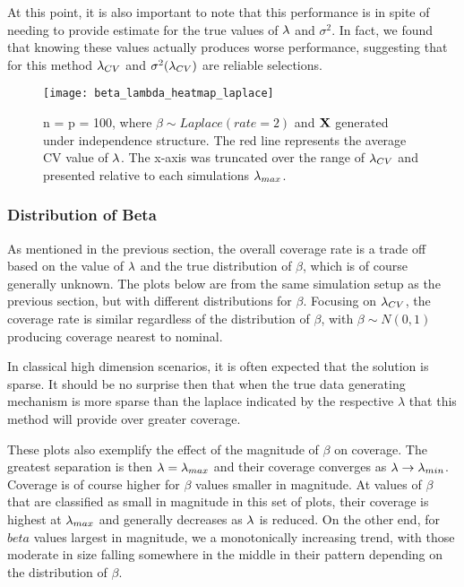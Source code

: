 At this point, it is also important to note that this performance is in spite of needing to provide estimate for the true values of $\lambda$ and $\sigma^2$. In fact, we found that knowing these values actually produces worse performance, suggesting that for this method $\lambda_{CV}$ and $\sigma^2(\lambda_{CV})$ are reliable selections.

\begin{figure}
  \texttt{[image: beta\_lambda\_heatmap\_laplace]}
  \caption{\label{Fig:beta_lambda_heatmap_laplace} n = p = 100, where $\beta \sim Laplace(rate = 2)$ and $\mathbf{X}$ generated under independence structure. The red line represents the average CV value of $\lambda$. The x-axis was truncated over the range of $\lambda_{CV}$ and presented relative to each simulations $\lambda_{max}$.}
\end{figure}

\subsubsection{Distribution of Beta}

As mentioned in the previous section, the overall coverage rate is a trade off based on the value of $\lambda$ and the true distribution of $\beta$, which is of course generally unknown. The plots below are from the same simulation setup as the previous section, but with different distributions for $\beta$. Focusing on $\lambda_{CV}$, the coverage rate is similar regardless of the distribution of $\beta$, with $\beta \sim N(0, 1)$ producing coverage nearest to nominal.

In classical high dimension scenarios, it is often expected that the solution is sparse. It should be no surprise then that when the true data generating mechanism is more sparse than the laplace indicated by the respective $\lambda$ that this method will provide over greater coverage.

These plots also exemplify the effect of the magnitude of $\beta$ on coverage. The greatest separation is then $\lambda = \lambda_{max}$ and their coverage converges as $\lambda \rightarrow \lambda_{min}$. Coverage is of course higher for $\beta$ values smaller in magnitude. At values of $\beta$ that are classified as small in magnitude in this set of plots, their coverage is highest at $\lambda_{max}$ and generally decreases as $\lambda$ is reduced. On the other end, for $beta$ values largest in magnitude, we a monotonically increasing trend, with those moderate in size falling somewhere in the middle in their pattern depending on the distribution of $\beta$.

